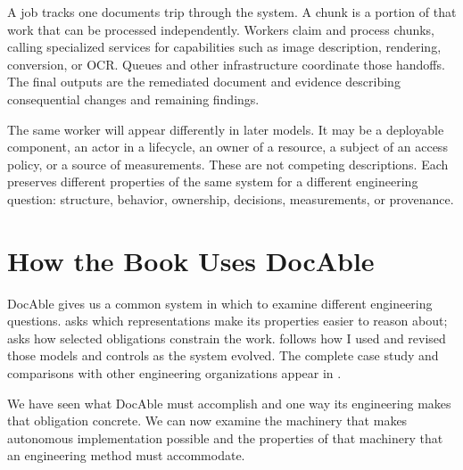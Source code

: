 A job tracks one document\textquotesingle s trip through the system. A chunk is a portion of that work that can be processed independently. Workers claim and process chunks, calling specialized services for capabilities such as image description, rendering, conversion, or OCR. Queues and other infrastructure coordinate those handoffs. The final outputs are the remediated document and evidence describing consequential changes and remaining findings.


The same worker will appear differently in later models. It may be a deployable component, an actor in a lifecycle, an owner of a resource, a subject of an access policy, or a source of measurements. These are not competing descriptions. Each preserves different properties of the same system for a different engineering question: structure, behavior, ownership, decisions, measurements, or provenance.

\section{How the Book Uses DocAble}\label{heading:how-the-book-uses-docable}



DocAble gives us a common system in which to examine different engineering questions.  asks which representations make its properties easier to reason about;  asks how selected obligations constrain the work.  follows how I used and revised those models and controls as the system evolved. The complete case study and comparisons with other engineering organizations appear in .


We have seen what DocAble must accomplish and one way its engineering makes that obligation concrete. We can now examine the machinery that makes autonomous implementation possible and the properties of that machinery that an engineering method must accommodate.
